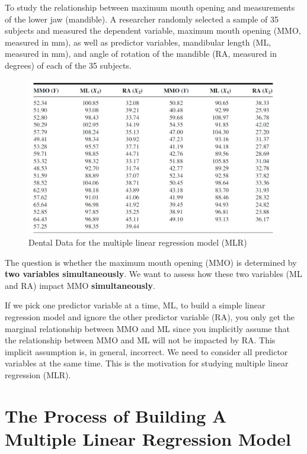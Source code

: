 \documentclass[
]{book}
\begin{document}
To study the relationship between maximum mouth opening and measurements of the lower jaw (mandible). A researcher randomly selected a sample of 35 subjects and measured the dependent variable, maximum mouth opening (MMO, measured in mm), as well as predictor variables, mandibular length (ML, measured in mm), and angle of rotation of the mandible (RA, measured in degrees) of each of the 35 subjects.

\begin{figure}

{\centering \includegraphics[width=0.8\linewidth]{img10/w10-DentalDataTable} 

}

\caption{Dental Data for the multiple linear regression model (MLR)}\label{fig:unnamed-chunk-152}
\end{figure}

The question is whether the maximum mouth opening (MMO) is determined by \textbf{two variables simultaneously}. We want to assess how these two variables (ML and RA) impact MMO \textbf{simultaneously}.

If we pick one predictor variable at a time, ML, to build a simple linear regression model and ignore the other predictor variable (RA), you only get the marginal relationship between MMO and ML since you implicitly assume that the relationship between MMO and ML will not be impacted by RA. This implicit assumption is, in general, incorrect. We need to consider all predictor variables at the same time. This is the motivation for studying multiple linear regression (MLR).

\hypertarget{the-process-of-building-a-multiple-linear-regression-model}{%
\section{The Process of Building A Multiple Linear Regression Model}\label{the-process-of-building-a-multiple-linear-regression-model}}
\end{document}
